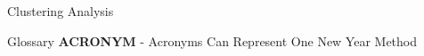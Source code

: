 \documentclass[final]{beamer}
\newlength{\sepwid}
\newlength{\onecolwid}
\newlength{\twocolwid}
\begin{document}
\begin{frame}[t]
\begin{columns}[t]
\begin{column}{\twocolwid}
\begin{columns}[t,totalwidth=\twocolwid]
\begin{column}{\onecolwid}
\begin{block}{Clustering Analysis}
\end{block}


\begin{alertblock}{Glossary}
\textbf{ACRONYM} - Acronyms Can Represent One New Year Method
\end{alertblock}



\end{column} %

\end{columns} %




\begin{columns}[t,totalwidth=\twocolwid] %

\begin{column}{\onecolwid} %



\end{column} %

\begin{column}{\onecolwid} %




\end{column} %

\end{columns} %

\end{column} %

\begin{column}{\sepwid}\end{column} %

\begin{column}{\onecolwid} %


\end{column}
\end{columns}
\end{frame}
\end{document}
